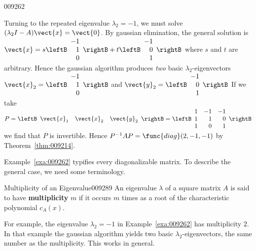 \begin{example}{}{009262}
\begin{solution}
Turning to the repeated eigenvalue $\lambda_{2} = -1$, we must solve $(\lambda_{2}I - A)\vect{x} = \vect{0}$. By gaussian elimination, the general solution is $\vect{x} = s \leftB \begin{array}{r}
-1 \\
1 \\
0
\end{array}\rightB + t \leftB \begin{array}{r}
-1\\
0\\
1
\end{array}\rightB$
 where $s$ and $t$ are arbitrary. Hence the gaussian algorithm produces \textit{two} basic $\lambda_{2}$-eigenvectors $\vect{x}_2 = \leftB \begin{array}{r}
-1\\
1\\
0
\end{array}\rightB$ and $\vect{y}_2 =  \leftB \begin{array}{r}
-1\\
0\\
1
\end{array}\rightB$
 If we take $P = \leftB \begin{array}{ccc}
\vect{x}_1 & \vect{x}_2 & \vect{y}_2
\end{array}\rightB = \leftB \begin{array}{rrr}
1 & -1 & -1 \\
1 & 1 & 0 \\
1 & 0 & 1
\end{array}\rightB$
 we find that $P$ is invertible. Hence $P^{-1}AP = \func{diag}(2, -1, -1)$ by Theorem~\ref{thm:009214}.
\end{solution}
\end{example}

Example~\ref{exa:009262} typifies every diagonalizable matrix. To describe the general case, we need some terminology.


\begin{definition}{Multiplicity of an Eigenvalue}{009289}
An eigenvalue $\lambda$ of a square matrix $A$ is said to have \textbf{multiplicity} $m$ if it occurs $m$ times as a root of the characteristic polynomial $c_{A}(x)$.
\end{definition}

\noindent For example, the eigenvalue $\lambda_{2} = -1$ in Example~\ref{exa:009262} has multiplicity $2$. In that example the gaussian algorithm yields two basic $\lambda_{2}$-eigenvectors, the same number as the multiplicity. This works in general.



